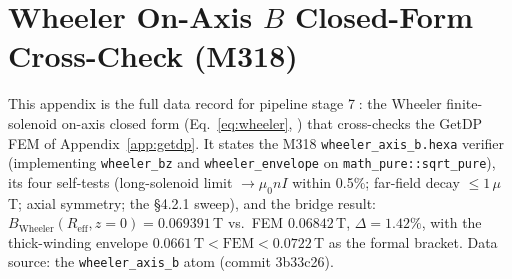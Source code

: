 \section{Wheeler On-Axis $B$ Closed-Form Cross-Check (M318)}
\label{app:wheeler}

This appendix is the full data record for pipeline stage
\textcircled{\scriptsize 7}: the Wheeler finite-solenoid on-axis closed
form (Eq.~\eqref{eq:wheeler}, \citep{jackson1999}) that cross-checks the
GetDP FEM of Appendix~\ref{app:getdp}. It states the M318
\texttt{wheeler\_axis\_b.hexa} verifier (implementing
\texttt{wheeler\_bz} and \texttt{wheeler\_envelope} on
\texttt{math\_pure::sqrt\_pure}), its four self-tests (long-solenoid limit
$\to\!\mu_0 nI$ within 0.5\%; far-field decay $\le\!1\,\mu$T; axial
symmetry; the \S4.2.1 sweep), and the bridge result:
$B_{\text{Wheeler}}(R_{\text{eff}},z\!=\!0)\!=\!0.069391$\,T vs.\ FEM
$0.06842$\,T, $\Delta\!=\!1.42\%$, with the thick-winding envelope
$0.0661\,\text{T}\!<\!\text{FEM}\!<\!0.0722$\,T as the formal bracket.
Data source: the \texttt{wheeler\_axis\_b} atom (commit 3b33c26).

